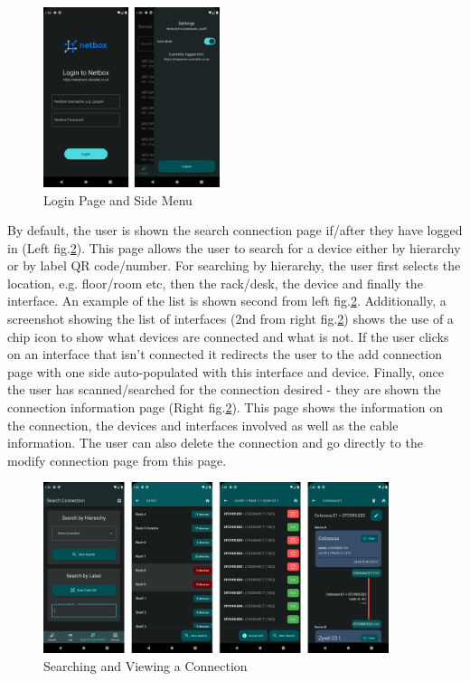 \documentclass [11pt,a4paper]{article}
\begin{document}
\begin{figure}[H]
    \centering
    \includegraphics[width=0.46\textwidth]{images/final_login_menu.png}
    \caption{Login Page and Side Menu}
    \label{fig:login}
\end{figure}
By default, the user is shown the search connection page if/after they have logged in (Left fig.\ref{fig:search_connection}). This page allows the user to search for a device either by hierarchy or by label QR code/number. For searching by hierarchy, the user first selects the location, e.g. floor/room etc, then the rack/desk, the device and finally the interface. An example of the list is shown second from left fig.\ref{fig:search_connection}. Additionally, a screenshot showing the list of interfaces (2nd from right fig.\ref{fig:search_connection}) shows the use of a chip icon to show what devices are connected and what is not. If the user clicks on an interface that isn't connected it redirects the user to the add connection page with one side auto-populated with this interface and device. Finally, once the user has scanned/searched for the connection desired - they are shown the connection information page (Right fig.\ref{fig:search_connection}). This page shows the information on the connection, the devices and interfaces involved as well as the cable information. The user can also delete the connection and go directly to the modify connection page from this page.

\begin{figure}[H]
    \centering
    \includegraphics[width=0.9\textwidth]{images/final_search.png}
    \caption{Searching and Viewing a Connection}
    \label{fig:search_connection}
\end{figure}
\end{document}
